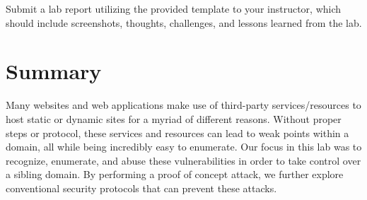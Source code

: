 \documentclass[letterpaper,12pt]{report}
\begin{document}
Submit a lab report utilizing the provided template to your instructor, which should include screenshots, thoughts, challenges, and lessons learned from the lab.


\section*{Summary}\label{sec:Summary}

Many websites and web applications make use of third-party services/resources to host static or dynamic sites for a myriad of different reasons. Without proper steps or protocol, these services and resources can lead to weak points within a domain, all while being incredibly easy to enumerate. Our focus in this lab was to recognize, enumerate, and abuse these vulnerabilities in order to take control over a sibling domain. By performing a proof of concept attack, we further explore conventional security protocols that can prevent these attacks. 



\end{document}
